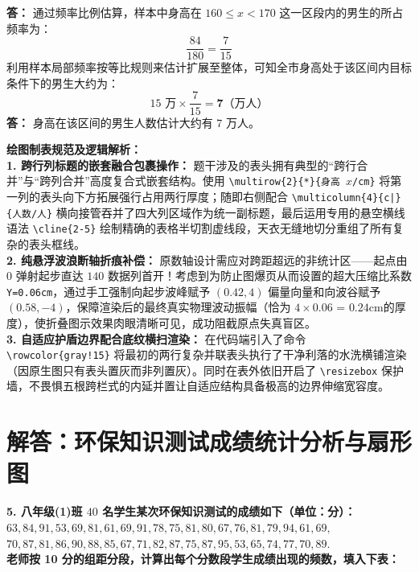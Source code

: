 \vspace{0.2cm}
\textbf{答：} 通过频率比例估算，样本中身高在 $160 \leqslant x < 170$ 这一区段内的男生的所占频率为：
$$\frac{84}{180} = \frac{7}{15}$$
利用样本局部频率按等比规则来估计扩展至整体，可知全市身高处于该区间内目标条件下的男生大约为：
$$15\text{ 万} \times \frac{7}{15} = \boldsymbol{7}\text{（万人）}$$
\textbf{答：} 身高在该区间的男生人数估计大约有 $7$ 万人。

\vspace{0.6cm}

{\small\color{blue!70!black}
\textbf{绘图制表规范及逻辑解析：}\\
\textbf{1. 跨行列标题的嵌套融合包裹操作：} 题干涉及的表头拥有典型的“跨行合并”与“跨列合并”高度复合式嵌套结构。使用 \texttt{\textbackslash multirow\{2\}\{*\}\{身高 $x$/cm\}} 将第一列的表头向下方拓展强行占用两行厚度；随即右侧配合 \texttt{\textbackslash multicolumn\{4\}\{c|\}\{人数/人\}} 横向接管吞并了四大列区域作为统一副标题，最后运用专用的悬空横线语法 \texttt{\textbackslash cline\{2-5\}} 绘制精确的表格半切割虚线段，天衣无缝地切分重组了所有复杂的表头框线。\\
\textbf{2. 纯悬浮波浪断轴折痕补偿：} 原数轴设计需应对跨距超远的非统计区——起点由 $0$ 弹射起步直达 $140$ 数据列首开！考虑到为防止图爆页从而设置的超大压缩比系数 \texttt{Y=0.06cm}，通过手工强制向起步波峰赋予 $(0.42, 4)$ 偏量向量和向波谷赋予 $(0.58, -4)$，保障渲染后的最终真实物理波动振幅（恰为 $4 \times 0.06$ = $0.24\text{cm}$的厚度），使折叠图示效果肉眼清晰可见，成功阻截原点失真盲区。\\
\textbf{3. 自适应护盾边界配合底纹横扫渲染：} 在代码端引入了命令 \texttt{\textbackslash rowcolor\{gray!15\}} 将最初的两行复杂并联表头执行了干净利落的水洗横铺渲染（因原生图只有表头置灰而非列置灰）。同时在表外依旧开启了 \texttt{\textbackslash resizebox} 保护墙，不畏惧五根跨栏式的内延并置让自适应结构具备极高的边界伸缩宽容度。
}

\newpage



\section{解答：环保知识测试成绩统计分析与扇形图}

\vspace{0.6cm}

\textbf{5. 八年级(1)班 $40$ 名学生某次环保知识测试的成绩如下（单位：分）：\\
$63, 84, 91, 53, 69, 81, 61, 69, 91, 78, 75, 81, 80, 67, 76, 81, 79, 94, 61, 69,$ \\
$70, 87, 81, 86, 90, 88, 85, 67, 71, 82, 87, 75, 87, 95, 53, 65, 74, 77, 70, 89.$ \\
老师按 10 分的组距分段，计算出每个分数段学生成绩出现的频数，填入下表：}

